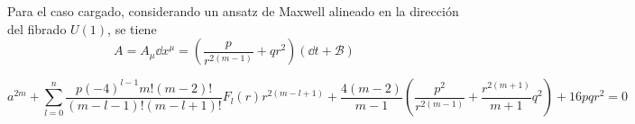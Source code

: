 Para el caso cargado, considerando un ansatz de Maxwell alineado en la dirección del fibrado $U(1)$, se tiene
\begin{equation*}
    A=A_\mu\dd x^\mu=\left(\frac{p}{r^{2(m-1)}}+q r^2\right)(\dd t+\mathcal{B})
\end{equation*}

\begin{equation*}
   a^{2m} +\sum_{l=0}^{n}\frac{p(-4)^{l-1}m!(m-2)!}{(m-l-1)!(m-l+1)!}F_l(r)r^{2(m-l+1)}+\frac{4(m-2)}{m-1}\left(\frac{p^2}{r^{2(m-1)}}+\frac{r^{2(m+1)}}{m+1}q^2\right)+16pq r^2=0
\end{equation*}
